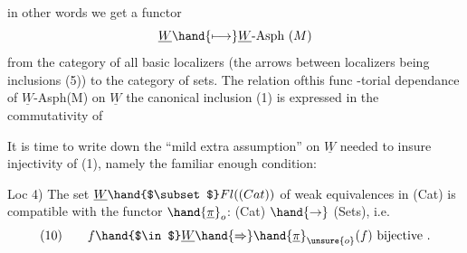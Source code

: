 in other words we get a functor
\[ \underline{W} \hand{\longmapsto} \underline{W}\text{-Asph }(M) \]
from the category of all basic localizers (the arrows between localizers
being inclusions (5))  to the category of sets.  The relation of\hand{$|$}this func%
-torial dependance  of  $\underline{W}$-Asph(M) on $\underline{W}$   \hand{(}the canonical inclusion (1) \hand{)}
is expressed in the commutativity of

It is time to write down the ``mild extra assumption'' on $\underline{W}$ needed to
insure injectivity of (1),  namely the familiar enough condition:

Loc 4)  The set $\underline{W} \hand{$\subset$} Fl((Cat))$ of weak equivalences in (Cat)  is compatible
with the functor $\hand{\underline{\pi}}_o$: (Cat) $\hand{\to}$ (Sets),  i.e.
\[ (10) \qquad f \hand{$\in$} \underline{W} \hand{\Rightarrow} \hand{\underline{\pi}}_{\unsure{o}}(f) \text{  bijective .} \]

